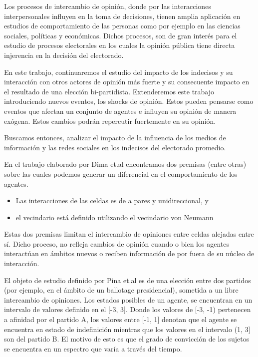 Los procesos de intercambio de opinión, donde por las interacciones interpersonales influyen en la toma de decisiones, tienen amplia aplicación en estudios de comportamiento de las personas como por ejemplo en las ciencias sociales, políticas y económicas. Dichos procesos, son de gran interés para el estudio de procesos electorales en los cuales la opinión pública tiene directa injerencia en la decisión del electorado.

En este trabajo, continuaremos el estudio del impacto de los indecisos y su interacción con otros actores de opinión más fuerte y su consecuente impacto en el resultado de una elección bi-partidista. Extenderemos este trabajo introduciendo nuevos eventos, los shocks de opinión. Estos pueden pensarse como eventos que afectan un conjunto de agentes e influyen su opinión de manera exógena. Estos cambios podrán repercutir fuertemente en su opinión.

Buscamos entonces, analizar el impacto de la influencia de los medios de información y las redes sociales en los indecisos del electorado promedio.


En el trabajo elaborado por Dima et.al encontramos dos premisas (entre otras)  sobre las cuales podemos generar un diferencial en el comportamiento de los agentes.

\begin{itemize}
    \item Las interacciones de las celdas es de a pares y unidireccional, y
    \item el vecindario está definido utilizando el vecindario von Neumann
\end{itemize}

Estas dos premisas limitan el intercambio de opiniones entre celdas alejadas entre sí. Dicho proceso, no refleja cambios de opinión cuando o bien los agentes interactúan en ámbitos nuevos o reciben información de por fuera de su núcleo de interacción.



El objeto de estudio definido por Pina et.al es de una elección entre dos
partidos (por ejemplo, en el ámbito de un ballotage presidencial), sometida a un libre
intercambio de opiniones.
Los estados posibles de un agente, se encuentran en un intervalo de valores definido en el [-3, 3]. Donde los valores de [-3, -1) pertenecen a afinidad por el partido A, los valores entre [-1, 1] denotan que el agente se encuentra en estado de indefinición mientras que los valores en el intervalo (1, 3] son del partido B.
El motivo de esto es que el grado de convicción de los sujetos se encuentra en un espectro que varía a través del tiempo.

